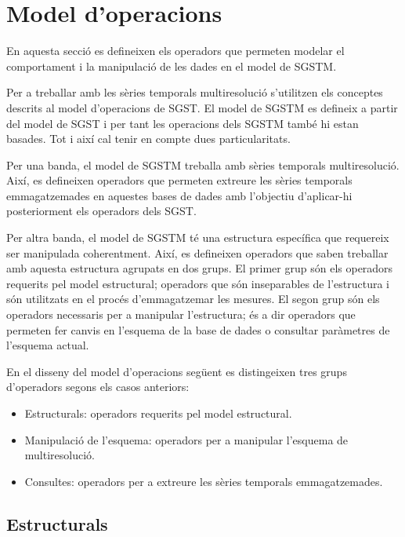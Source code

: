\section{Model d'operacions}

En aquesta secció es defineixen els operadors que permeten modelar el
comportament i la manipulació de les dades en el model de SGSTM.

Per a treballar amb les sèries temporals multiresolució s'utilitzen
els conceptes descrits al model d'operacions de SGST. El model de
SGSTM es defineix a partir del model de SGST i per tant les operacions
dels SGSTM també hi estan basades. Tot i així cal tenir en compte dues
particularitats.

Per una banda, el model de SGSTM treballa amb sèries temporals
multiresolució. Així, es defineixen operadors que permeten extreure
les sèries temporals emmagatzemades en aquestes bases de dades amb
l'objectiu d'aplicar-hi posteriorment els operadors dels SGST.

Per altra banda, el model de SGSTM té una estructura específica que
requereix ser manipulada coherentment. Així, es defineixen operadors
que saben treballar amb aquesta estructura agrupats en dos grups.  El
primer grup són els operadors requerits pel model estructural;
operadors que són inseparables de l'estructura i són utilitzats en el
procés d'emmagatzemar les mesures. El segon grup són els operadors
necessaris per a manipular l'estructura; és a dir operadors que
permeten fer canvis en l'esquema de la base de dades o consultar
paràmetres de l'esquema actual.


En el disseny del model d'operacions següent es distingeixen tres
grups d'operadors segons els casos anteriors:

\begin{itemize}
\item Estructurals: operadors requerits pel model estructural.
\item Manipulació de l'esquema: operadors per a manipular l'esquema de
  multiresolució.
\item Consultes: operadors per a extreure les sèries temporals
  emmagatzemades.
\end{itemize}





\subsection{Estructurals}
\label{sec:model:sgstm-estructurals}

